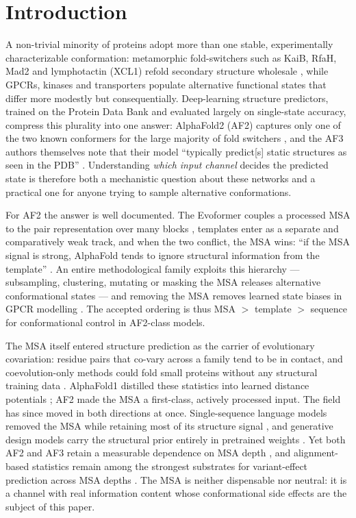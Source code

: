 \documentclass[11pt]{article}
\begin{document}
\section{Introduction}

A non-trivial minority of proteins adopt more than one stable, experimentally
characterizable conformation: metamorphic fold-switchers such as KaiB, RfaH,
Mad2 and lymphotactin (XCL1) refold secondary structure wholesale
\cite{porter2018,chang2015,burmann2012,luo2004,tuinstra2008}, while GPCRs,
kinases and transporters populate alternative functional states that differ
more modestly but consequentially. Deep-learning structure predictors,
trained on the Protein Data Bank and evaluated largely on single-state
accuracy, compress this plurality into one answer: AlphaFold2 (AF2) captures
only one of the two known conformers for the large majority of fold
switchers \cite{chakravarty2022,chakravarty2024}, and the AF3 authors
themselves note that their model ``typically predict[s] static structures as
seen in the PDB'' \cite{abramson2024}. Understanding \emph{which input
channel} decides the predicted state is therefore both a mechanistic question
about these networks and a practical one for anyone trying to sample
alternative conformations.

For AF2 the answer is well documented. The Evoformer couples a processed MSA
to the pair representation over many blocks \cite{jumper2021}, templates
enter as a separate and comparatively weak track, and when the two conflict,
the MSA wins: ``if the MSA signal is strong, AlphaFold tends to ignore
structural information from the template'' \cite{kovalevskiy2024}. An entire
methodological family exploits this hierarchy --- subsampling, clustering,
mutating or masking the MSA releases alternative conformational states
\cite{delalamo2022,stein2022,wayment2024,kalakoti2025} --- and removing the
MSA removes learned state biases in GPCR modelling \cite{heo2022,sala2023}.
The accepted ordering is thus MSA $>$ template $>$ sequence for
conformational control in AF2-class models.

The MSA itself entered structure prediction as the carrier of evolutionary
covariation: residue pairs that co-vary across a family tend to be in
contact, and coevolution-only methods could fold small proteins without any
structural training data \cite{marks2012}. AlphaFold1 distilled these
statistics into learned distance potentials \cite{senior2020}; AF2 made the
MSA a first-class, actively processed input. The field has since moved in
both directions at once. Single-sequence language models removed the MSA
while retaining most of its structure signal \cite{lin2023,hayes2024}, and
generative design models carry the structural prior entirely in pretrained
weights \cite{watson2023}. Yet both AF2 and AF3 retain a measurable
dependence on MSA depth \cite{jumper2021,abramson2024}, and alignment-based
statistics remain among the strongest substrates for variant-effect
prediction across MSA depths \cite{notin2023,akiyama2025}. The MSA is
neither dispensable nor neutral: it is a channel with real information
content whose conformational side effects are the subject of this paper.
\end{document}
